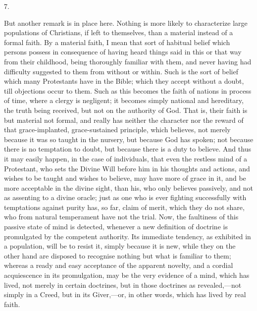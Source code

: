 7.

But another remark is in place here. Nothing is more likely to
characterize large populations of Christians, if left to themselves,
than a material instead of a formal faith. By a material faith, I mean
that sort of habitual belief which persons possess in consequence of
having heard things said in this or that way from their childhood,
being thoroughly familiar with them, and never having had difficulty
suggested to them from without or within. Such is the sort of belief
which many Protestants have in the Bible; which they accept without a
doubt, till objections occur to them. Such as this becomes the faith
of nations in process of time, where a clergy is negligent; it becomes
simply national and hereditary, the truth being received, but not on
the authority of God. That is, their faith is but material not formal,
and really has neither the character nor the reward of that
grace-implanted, grace-sustained principle, which believes, not merely
because it was so taught in the nursery, but because God has spoken;
not because there is no temptation to doubt, but because there is a
duty to believe. And thus it may easily happen, in the case of
individuals, that even the restless mind of a Protestant, who sets the
Divine Will before him in his thoughts and actions, and wishes to be
taught and wishes to believe, may have more of grace in it, and be
more acceptable in the divine sight, than his, who only believes
passively, and not as assenting to a divine oracle; just as one who is
ever fighting successfully with temptations against purity has, so
far, claim of merit, which they do not share, who from natural
temperament have not the trial. Now, the faultiness of this passive
state of mind is detected, whenever a new definition of doctrine is
promulgated by the competent authority. Its immediate tendency, as
exhibited in a population, will be to resist it, simply because it is
new, while they on the other hand are disposed to recognise nothing
but what is familiar to them; whereas a ready and easy acceptance of
the apparent novelty, and a cordial acquiescence in its promulgation,
may be the very evidence of a mind, which has lived, not merely in
certain doctrines, but in those doctrines as revealed,—not simply in
a Creed, but in its Giver,—or, in other words, which has lived by
real faith.


